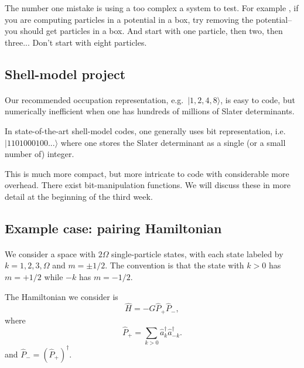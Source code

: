 \noindent
The number one mistake is using a too complex a system to test. For example ,
if you are computing particles in a potential in a box, try removing the potential--you should get 
particles in a box. And start with one particle, then two, then three... Don't start with 
eight particles.



\subsection*{Shell-model project}

\paragraph{}

Our recommended occupation representation, e.g.~$| 1,2,4,8 \rangle$, is 
easy to code, but numerically inefficient when one has hundreds of 
millions of Slater determinants.

In state-of-the-art shell-model codes, one generally uses bit 
representation, i.e.~$|1101000100... \rangle$ where one stores 
the Slater determinant as a single (or a small number of) integer.

This is much more compact, but more intricate to code with considerable 
more overhead. There exist 
bit-manipulation functions. We will discuss these in more detail at the beginning of the third week.



\subsection*{Example case: pairing Hamiltonian}

\paragraph{}

We consider a space with $2\Omega$ single-particle states, with each 
state labeled by 
$k = 1, 2, 3, \Omega$ and $m = \pm 1/2$. The convention is that 
the state with $k>0$ has $m = + 1/2$ while $-k$ has $m = -1/2$.

The Hamiltonian we consider is 
\[
\hat{H} = -G \hat{P}_+ \hat{P}_-,
\]
where
\[
\hat{P}_+ = \sum_{k > 0} \hat{a}^\dagger_k \hat{a}^\dagger_{-{k}}.
\]
and $\hat{P}_- = ( \hat{P}_+)^\dagger$.

